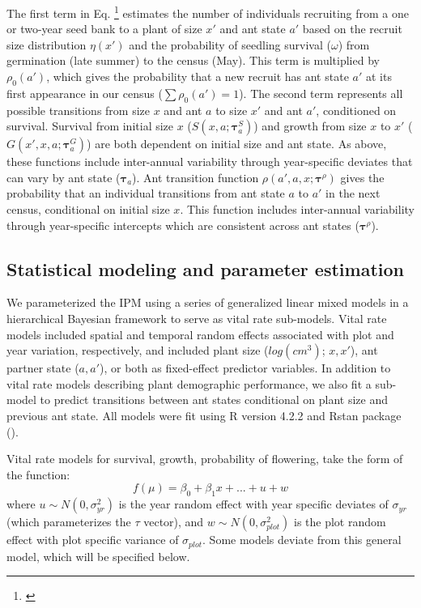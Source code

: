 \documentclass[11pt]{article}
\newcommand{\tom}[2]{{\color{red}{#1}}\footnote{\textit{\color{red}{#2}}}}
\begin{document}
\noindent The first term in Eq. \tom{\ref{eqn:IPM2}}{We should label equations. I am not sure why the equation label is not working here and I did not try to figure it out. It is probably something with the linenomath formatting.} estimates the number of individuals recruiting from a one or two-year seed bank to a plant of size $x'$ and ant state $a'$ based on the recruit size distribution $\eta(x')$ and the probability of seedling survival ($\omega$) from germination (late summer) to the census (May).
This term is multiplied by $\rho_{0}(a')$, which gives the probability that a new recruit has ant state $a'$ at its first appearance in our census ($\sum\rho_{0}(a')=1$). 
The second term represents all possible transitions from size $x$ and ant $a$ to size $x'$ and ant $a'$, conditioned on survival. 
Survival from initial size $x$ ($S(x,a;\pmb{\tau}^S_{a})$) and growth from size $x$ to $x'$ ($G(x',x,a;\pmb{\tau}^G_{a})$) are both dependent on initial size and ant state. 
As above, these functions include inter-annual variability through year-specific deviates that can vary by ant state ($\pmb{\tau}_{a}$). 
Ant transition function $\rho(a',a,x;\pmb{\tau}^{\rho})$ gives the probability that an individual transitions from ant state $a$ to $a'$ in the next census, conditional on initial size $x$. 
This function includes inter-annual variability through year-specific intercepts which are consistent across ant states ($\pmb{\tau}^\rho$).

\subsection*{Statistical modeling and parameter estimation}
We parameterized the IPM using a series of generalized linear mixed models in a hierarchical Bayesian framework to serve as vital rate sub-models. 
Vital rate models included spatial and temporal random effects associated with plot and year variation, respectively, and included plant size ($log(cm^3)$; $x,x'$), ant partner state ($a,a'$), or both as fixed-effect predictor variables. 
In addition to vital rate models describing plant demographic performance, we also fit a sub-model to predict transitions between ant states conditional on plant size and previous ant state. 
All models were fit using R version 4.2.2 and Rstan package (\cite{Rstancite, Rcite}).

Vital rate models for survival, growth, probability of flowering,  take the form of the function:
$$ f(\mu) = \beta_0 + \beta_1 x + ... + u + w $$
\noindent where $u \sim N(0,\sigma_{yr }^{2})$ is the year random effect with year specific deviates of $\sigma_{yr}$ (which parameterizes the $\tau$ vector), and $w \sim N(0,\sigma_{plot}^{2})$ is the plot random effect with plot specific variance of $\sigma_{plot}$. 
Some models deviate from this general model, which will be specified below.
\end{document}
